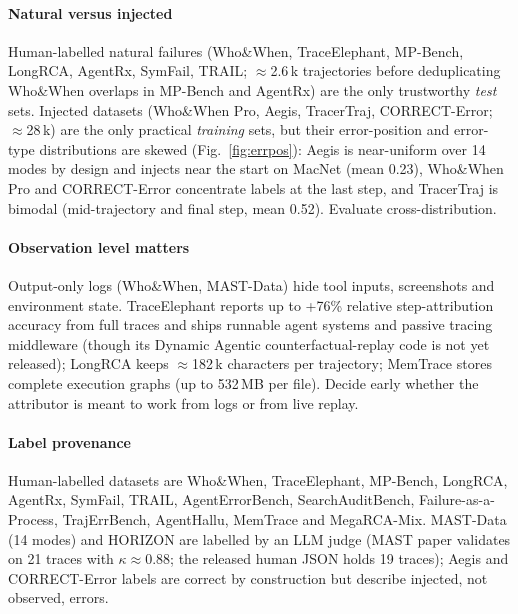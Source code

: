 \paragraph{Natural versus injected} Human-labelled natural failures (Who\&When, TraceElephant, MP-Bench, LongRCA, AgentRx, SymFail, TRAIL; $\approx$2.6\,k trajectories before deduplicating Who\&When overlaps in MP-Bench and AgentRx) are the only trustworthy \emph{test} sets. Injected datasets (Who\&When Pro, Aegis, TracerTraj, CORRECT-Error; $\approx$28\,k) are the only practical \emph{training} sets, but their error-position and error-type distributions are skewed (Fig.~\ref{fig:errpos}): Aegis is near-uniform over 14 modes by design and injects near the start on MacNet (mean 0.23), Who\&When Pro and CORRECT-Error concentrate labels at the last step, and TracerTraj is bimodal (mid-trajectory and final step, mean 0.52). Evaluate cross-distribution.

\paragraph{Observation level matters} Output-only logs (Who\&When, MAST-Data) hide tool inputs, screenshots and environment state. TraceElephant reports up to +76\% relative step-attribution accuracy from full traces and ships runnable agent systems and passive tracing middleware (though its Dynamic Agentic counterfactual-replay code is not yet released); LongRCA keeps $\approx$182\,k characters per trajectory; MemTrace stores complete execution graphs (up to 532\,MB per file). Decide early whether the attributor is meant to work from logs or from live replay.

\paragraph{Label provenance} Human-labelled datasets are Who\&When, TraceElephant, MP-Bench, LongRCA, AgentRx, SymFail, TRAIL, AgentErrorBench, SearchAuditBench, Failure-as-a-Process, TrajErrBench, AgentHallu, MemTrace and MegaRCA-Mix. MAST-Data (14 modes) and HORIZON are labelled by an LLM judge (MAST paper validates on 21 traces with $\kappa\approx0.88$; the released human JSON holds 19 traces); Aegis and CORRECT-Error labels are correct by construction but describe injected, not observed, errors.

